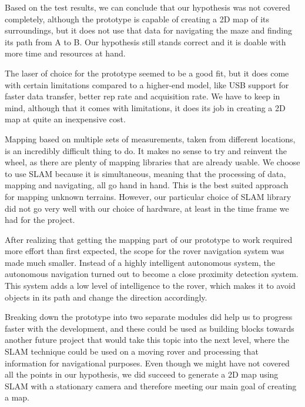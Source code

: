 Based on the test results, we can conclude that our hypothesis was not covered completely, although the prototype is capable of creating a 2D map of its surroundings, but it does not use that data for navigating the maze and finding its path from A to B. Our hypothesis still stands correct and it is doable with more time and resources at hand.

The laser of choice for the prototype seemed to be a good fit, but it does come with certain limitations compared to a higher-end model, like USB support for faster data transfer, better rep rate and acquisition rate. We have to keep in mind, although that it comes with limitations, it does its job in creating a 2D map at quite an inexpensive cost.

Mapping based on multiple sets of measurements, taken from different locations, is an incredibly difficult thing to do. It makes no sense to try and reinvent the wheel, as there are plenty of mapping libraries that are already usable. We choose to use SLAM because it is simultaneous, meaning that the processing of data, mapping and navigating, all go hand in hand. This is the best suited approach for mapping unknown terrains. However, our particular choice of SLAM library did not go very well with our choice of hardware, at least in the time frame we had for the project.

After realizing that getting the mapping part of our prototype to work required more effort than first expected, the scope for the rover navigation system was made much smaller. Instead of a highly intelligent autonomous system, the autonomous navigation turned out to become a close proximity detection system. This system adds a low level of intelligence to the rover, which makes it to avoid objects in its path and change the direction accordingly.
 
Breaking down the prototype into two separate modules did help us to progress faster with the development, and these could be used as building blocks towards another future project that would take this topic into the next level, where the SLAM technique could be used on a moving rover and processing that information for navigational purposes. Even though we might have not covered all the points in our hypothesis, we did succeed to generate a 2D map using SLAM with a stationary camera and therefore meeting our main goal of creating a map. 